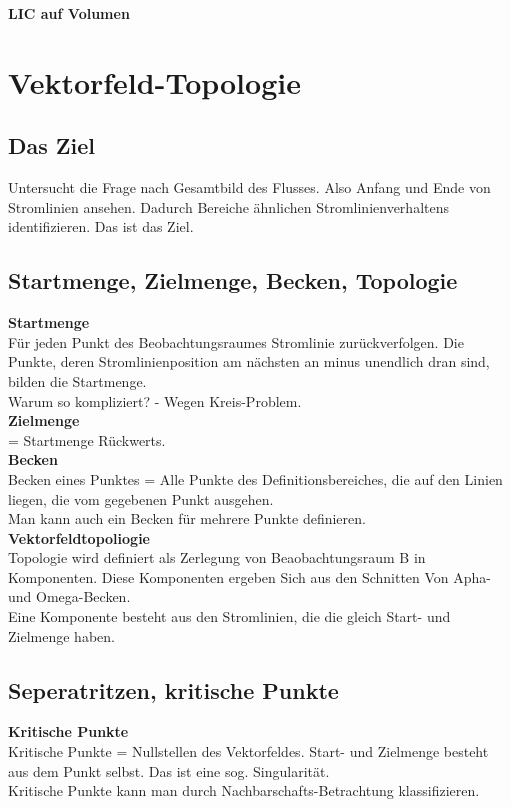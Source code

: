 \documentclass{article}
\begin{document}
\noindent \textbf{LIC auf Volumen}

\pagebreak
\section{Vektorfeld-Topologie}

\subsection{Das Ziel}
Untersucht die Frage nach Gesamtbild des Flusses. Also Anfang und Ende von Stromlinien ansehen. Dadurch Bereiche ähnlichen Stromlinienverhaltens identifizieren. Das ist das Ziel.\\

\subsection{Startmenge, Zielmenge, Becken, Topologie}
\noindent \textbf{Startmenge}\\
Für jeden Punkt des Beobachtungsraumes Stromlinie zurückverfolgen. Die Punkte, deren Stromlinienposition am nächsten an minus unendlich dran sind, bilden die Startmenge.\\
Warum so kompliziert? - Wegen Kreis-Problem.\\

\noindent \textbf{Zielmenge}\\
= Startmenge Rückwerts.\\

\noindent \textbf{Becken}\\
Becken eines Punktes = Alle Punkte des Definitionsbereiches, die auf den Linien liegen, die vom gegebenen Punkt ausgehen.\\ 
Man kann auch ein Becken für mehrere Punkte definieren.\\

\noindent \textbf{Vektorfeldtopoliogie}\\
Topologie wird definiert als Zerlegung von Beaobachtungsraum B in Komponenten. Diese Komponenten ergeben Sich aus den Schnitten Von Apha- und Omega-Becken. \\
Eine Komponente besteht aus den Stromlinien, die die gleich Start- und Zielmenge haben.


\subsection{Seperatritzen, kritische Punkte}
\noindent \textbf{Kritische Punkte}\\
Kritische Punkte = Nullstellen des Vektorfeldes. Start- und Zielmenge besteht aus dem Punkt selbst. Das ist eine sog. Singularität.\\
Kritische Punkte kann man durch Nachbarschafts-Betrachtung klassifizieren.\\
\end{document}
